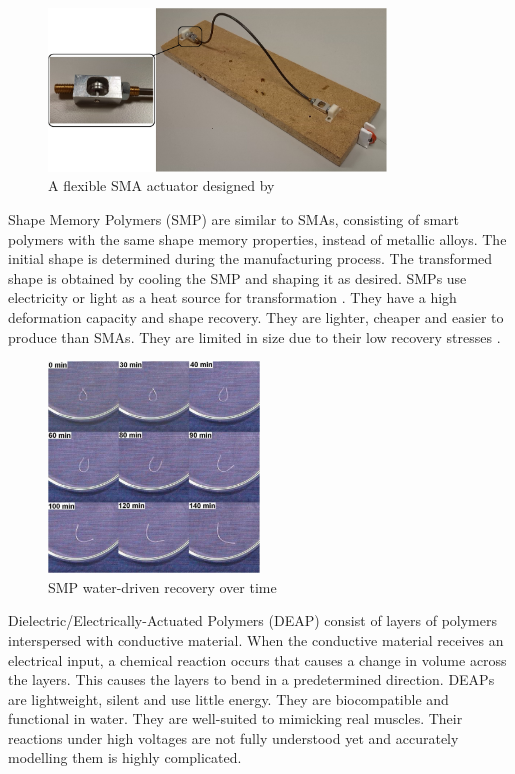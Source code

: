 \begin{figure}[H]
	\centering
	\includegraphics[width=0.8\textwidth]{SMA.png}
	\caption[A flexible SMA actuator]{A flexible SMA actuator designed by \cite{Villoslada2014}}
	\label{fig:sma}
\end{figure}

Shape Memory Polymers (SMP) are similar to SMAs, consisting of smart polymers with the same shape memory properties, instead of metallic alloys. The initial shape is determined during the manufacturing process. The transformed shape is obtained by cooling the SMP and shaping it as desired. SMPs use electricity or light as a heat source for transformation \citep{Behl2007}. They have a high deformation capacity and shape recovery. They are lighter, cheaper and easier to produce than SMAs. They are limited in size due to their low recovery stresses \citep{Huang2005, Rodriguez2016, Behl2007}.

\begin{figure}[H]
	\centering
	\includegraphics[width=0.5\textwidth]{SMP.png}
	\caption[SMP water-driven recovery]{SMP water-driven recovery over time \citep{Huang2005}}
	\label{fig:smp}
\end{figure}

Dielectric/Electrically-Actuated Polymers (DEAP) consist of layers of polymers interspersed with conductive material. When the conductive material receives an electrical input, a chemical reaction occurs that causes a change in volume across the layers. This causes the layers to bend in a predetermined direction. DEAPs are lightweight, silent and use little energy. They are biocompatible and functional in water. They are well-suited to mimicking real muscles. Their reactions under high voltages are not fully understood yet and accurately modelling them is highly complicated. \citep{Mutlu2014}

